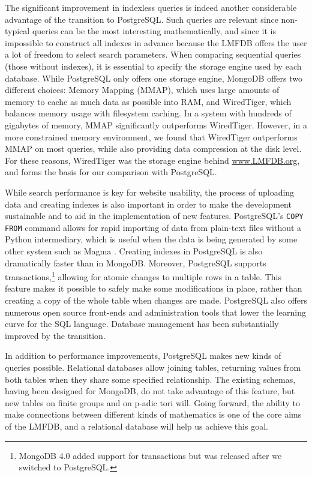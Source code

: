 \documentclass{article}
\begin{document}
The significant improvement in indexless queries is indeed another considerable advantage of the transition to PostgreSQL.
Such queries are relevant since non-typical queries can be the most interesting mathematically, and since it is impossible to construct all indexes in advance because the LMFDB offers the user a lot of freedom to select search parameters.
When comparing sequential queries (those without indexes), it is essential to specify the storage engine used by each database.
While PostgreSQL only offers one storage engine, MongoDB offers two different choices: Memory Mapping (MMAP), which uses large amounts of memory to cache as much data as possible into RAM, and WiredTiger, which balances memory usage with filesystem caching.
In a system with hundreds of gigabytes of memory, MMAP significantly outperforms WiredTiger.
However, in a more constrained memory environment, we found that WiredTiger outperforms MMAP on most queries, while also providing data compression at the disk level.
For these reasons, WiredTiger was the storage engine behind \url{www.LMFDB.org}, and forms the basis for our comparison with PostgreSQL. 

While search performance is key for website usability, the process of uploading data and creating indexes is also important in order to make the development sustainable and to aid in the implementation of new features.
PostgreSQL's \texttt{COPY FROM} command allows for rapid importing of data from plain-text files without a Python intermediary, which is useful when the data is being generated by some other system such as Magma \cite{magma}.
Creating indexes in PostgreSQL is also dramatically faster than in MongoDB. 
Moreover, PostgreSQL supports transactions,\footnote{MongoDB 4.0 added support for transactions but was released after we switched to PostgreSQL.} allowing for atomic changes to multiple rows in a table.
This feature makes it possible to safely make some modifications in place, rather than creating a copy of the whole table when changes are made.
PostgreSQL also offers numerous open source front-ends and administration tools \cite{pgadmin,adminer} that lower the learning curve for the SQL language.
Database management has been substantially improved by the transition.

In addition to performance improvements, PostgreSQL makes new kinds of queries possible.
Relational databases allow joining tables, returning values from both tables when they share some specified relationship.
The existing schemas, having been designed for MongoDB, do not take advantage of this feature, but new tables on finite groups and on p-adic tori will.
Going forward, the ability to make connections between different kinds of mathematics is one of the core aims of the LMFDB, and a relational database will help us achieve this goal.
\end{document}
